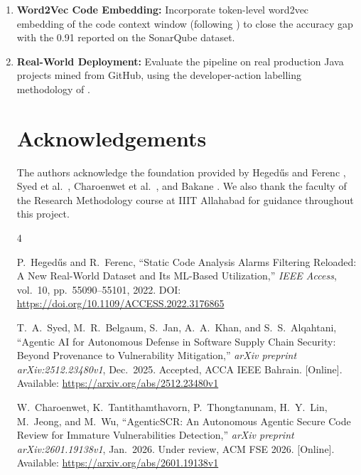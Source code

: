 \documentclass[conference]{IEEEtran}
\begin{document}
\begin{enumerate}[leftmargin=*, label=\arabic*.]
  \item \textbf{Word2Vec Code Embedding:} Incorporate token-level word2vec
        embedding of the code context window (following \cite{hegedus2022sca})
        to close the accuracy gap with the 0.91 reported on the SonarQube dataset.
  \item \textbf{Real-World Deployment:} Evaluate the pipeline on real production
        Java projects mined from GitHub, using the developer-action labelling
        methodology of \cite{hegedus2022sca}.


\section*{Acknowledgements}

The authors acknowledge the foundation provided by Heged\H{u}s and
Ferenc \cite{hegedus2022sca}, Syed et al.\ \cite{syed2025agentic},
Charoenwet et al.\ \cite{charoenwet2026agenticscr}, and
Bakane \cite{bakane2025thesis}. We also thank the faculty of the Research
Methodology course at IIIT Allahabad for guidance throughout this project.


\begin{thebibliography}{4}

P.~Heged\H{u}s and R.~Ferenc,
``Static Code Analysis Alarms Filtering Reloaded: A New Real-World Dataset and
  Its ML-Based Utilization,''
\textit{IEEE Access}, vol.~10, pp.~55090--55101, 2022.
DOI: \url{https://doi.org/10.1109/ACCESS.2022.3176865}

T.~A.~Syed, M.~R.~Belgaum, S.~Jan, A.~A.~Khan, and S.~S.~Alqahtani,
``Agentic AI for Autonomous Defense in Software Supply Chain Security:
  Beyond Provenance to Vulnerability Mitigation,''
\textit{arXiv preprint arXiv:2512.23480v1}, Dec.\ 2025. Accepted, ACCA IEEE Bahrain.
[Online]. Available: \url{https://arxiv.org/abs/2512.23480v1}

W.~Charoenwet, K.~Tantithamthavorn, P.~Thongtanunam, H.~Y.~Lin,
M.~Jeong, and M.~Wu,
``{AgenticSCR}: An Autonomous Agentic Secure Code Review for Immature
  Vulnerabilities Detection,''
\textit{arXiv preprint arXiv:2601.19138v1}, Jan.\ 2026.
Under review, ACM FSE 2026.
[Online]. Available: \url{https://arxiv.org/abs/2601.19138v1}


\end{thebibliography}
\end{enumerate}
\end{document}
